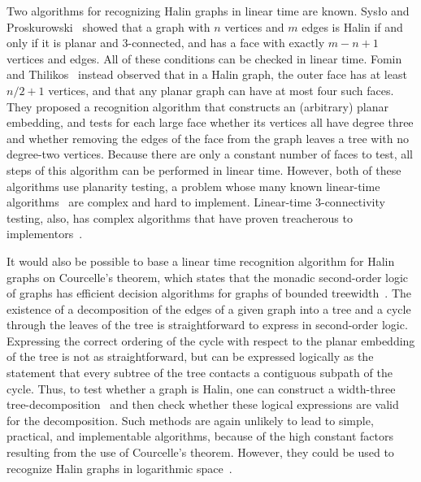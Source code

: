 \documentclass{article}
\begin{document}
Two algorithms for recognizing Halin graphs in linear time are known. Sys{\l}o and Proskurowski~\cite{SysPro-GT-83} showed that a graph with $n$ vertices and $m$ edges is Halin if and only if it is planar and 3-connected, and has a face with exactly $m-n+1$ vertices and edges. All of these conditions can be checked in linear time. Fomin and Thilikos~\cite{FomThi-JDA-06} instead observed that in a Halin graph, the outer face has at least $n/2+1$ vertices, and that any planar graph can have at most four such faces. They proposed a recognition algorithm that constructs an (arbitrary) planar embedding, and tests for each large face whether its vertices all have degree three and whether removing the edges of the face from the graph leaves a tree with no degree-two vertices. Because there are only a constant number of faces to test, all steps of this algorithm can be performed in linear time. However, both of these algorithms use planarity testing, a problem whose many known linear-time algorithms~\cite{HopTar-JACM-74,BooLue-JCSS-76,ChiNisAbe-JCSS-85,ShiHsu-TCS-99,BoyMyr-JGAA-04,FraOssRos-IJFCS-06,Sch-MFCS-13} are complex and hard to implement. Linear-time 3-connectivity testing, also, has complex algorithms that have proven treacherous to implementors~\cite{HopTar-SJC-73,GutMut-GD-00}.

It would also be possible to base a linear time recognition algorithm for Halin graphs on Courcelle's theorem, which states that the monadic second-order logic of graphs has efficient decision algorithms for graphs of bounded treewidth~\cite{Cou-IC-90}. The existence of a decomposition of the edges of a given graph into a tree and a cycle through the leaves of the tree is straightforward to express in second-order logic. Expressing the correct ordering of the cycle with respect to the planar embedding of the tree is not as straightforward, but can be expressed logically as the statement that every subtree of the tree contacts a contiguous subpath of the cycle. Thus, to test whether a graph is Halin, one can construct a width-three tree-decomposition~\cite{Bod-SJC-96} and then check whether these logical expressions are valid for the decomposition. Such methods are again unlikely to lead to simple, practical, and implementable algorithms, because of the high constant factors resulting from the use of Courcelle's theorem. However, they could be used to recognize Halin graphs in logarithmic space~\cite{ElbJakTan-FOCS-10}.
\end{document}

